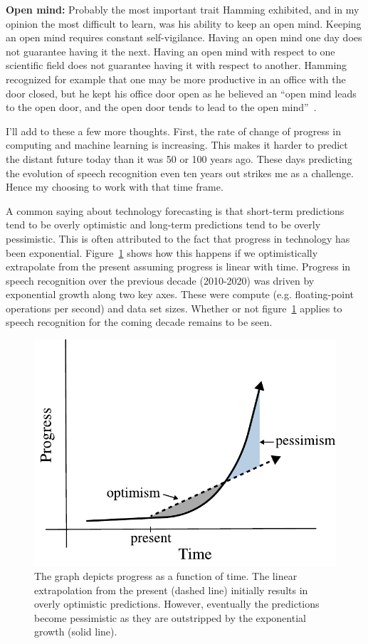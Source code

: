 {\bf Open mind:} Probably the most important trait Hamming exhibited, and in my
opinion the most difficult to learn, was his ability to keep an open mind.
Keeping an open mind requires constant self-vigilance. Having an open mind one
day does not guarantee having it the next. Having an open mind with respect to
one scientific field does not guarantee having it with respect to another.
Hamming recognized for example that one may be more productive in an office
with the door closed, but he kept his office door open as he believed an ``open
mind leads to the open door, and the open door tends to lead to the open
mind''~\citep[chp. 30]{hamming1997art}.

I'll add to these a few more thoughts. First, the rate of change of progress in
computing and machine learning is increasing. This makes it harder to predict
the distant future today than it was 50 or 100 years ago. These days predicting
the evolution of speech recognition even ten years out strikes me as a
challenge. Hence my choosing to work with that time frame.

A common saying about technology forecasting is that short-term predictions
tend to be overly optimistic and long-term predictions tend to be overly
pessimistic. This is often attributed to the fact that progress in technology
has been exponential. Figure~\ref{fig:exponential_growth} shows how this
happens if we optimistically extrapolate from the present assuming progress is
linear with time. Progress in speech recognition over the previous decade
(2010-2020) was driven by exponential growth along two key axes. These
were compute (e.g. floating-point operations per second) and data set
sizes. Whether or not figure~\ref{fig:exponential_growth} applies to speech
recognition for the coming decade remains to be seen.

\begin{figure}
    \centering
    \includegraphics[width=\linewidth]{figures/exponential_growth}
    \caption{The graph depicts progress as a function of time. The linear
    extrapolation from the present (dashed line) initially results in overly
    optimistic predictions.  However, eventually the predictions become
    pessimistic as they are outstripped by the exponential growth (solid
    line).}
    \label{fig:exponential_growth}
\end{figure}

